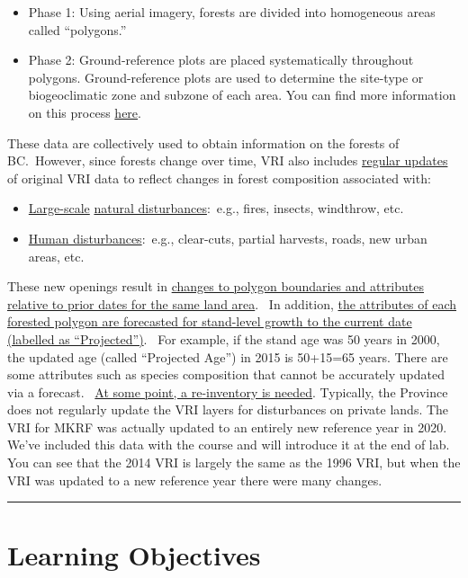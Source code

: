 \documentclass[
  letterpaper,
]{book}
\begin{document}
\begin{itemize}
\item
  Phase 1: Using aerial imagery, forests are divided into homogeneous
  areas called ``polygons.''
\item
  Phase 2: Ground-reference plots are placed systematically throughout
  polygons. Ground-reference plots are used to determine the site-type
  or biogeoclimatic zone and subzone of each area. You can find more
  information on this process
  \href{https://cfcg.forestry.ubc.ca/resources/cataloguing-in-situ-genetic-resources/about-bec-and-bgc-units/}{here}.
\end{itemize}

These data are collectively used to obtain information on the forests of
BC.~However, since forests change over time, VRI also includes
\ul{regular updates} of original VRI data to reflect changes in forest
composition associated with:

\begin{itemize}
\item
  \ul{Large-scale} \ul{natural disturbances}:~e.g., fires, insects,
  windthrow, etc.
\item
  \ul{Human disturbances}:~e.g., clear-cuts, partial harvests, roads,
  new urban areas, etc.
\end{itemize}

These new openings result in \ul{changes to polygon boundaries and
attributes relative to prior dates for the same land area}.~ In
addition, \ul{the attributes of each forested polygon are forecasted for
stand-level growth to the current date (labelled as ``Projected'')}.~
For example, if the stand age was 50 years in 2000, the updated age
(called ``Projected Age'') in 2015 is 50+15=65 years. There are some
attributes such as species composition that cannot be accurately updated
via a forecast.~ \ul{At some point, a re-inventory is needed}.
Typically, the Province does not regularly update the VRI layers for
disturbances on private lands. The VRI for MKRF was actually updated to
an entirely new reference year in 2020. We've included this data with
the course and will introduce it at the end of lab. You can see that the
2014 VRI is largely the same as the 1996 VRI, but when the VRI was
updated to a new reference year there were many changes.

\begin{center}\rule{0.5\linewidth}{0.5pt}\end{center}

\hypertarget{learning-objectives-1}{%
\section*{Learning Objectives}\label{learning-objectives-1}}
\end{document}
